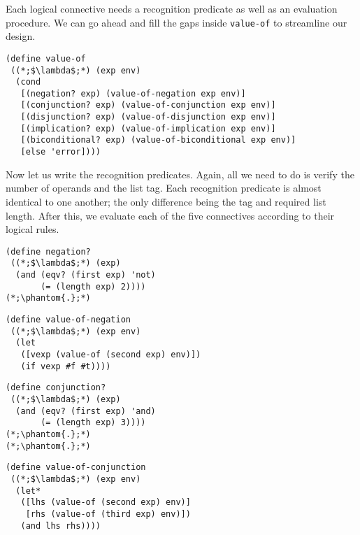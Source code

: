 Each logical connective needs a recognition predicate as well as an evaluation procedure. We can go ahead and fill the gaps inside \texttt{value-of} to streamline our design.

\begin{cl}[]{}\begin{lstlisting}[language=MyScheme]
(define value-of
 ((*;$\lambda$;*) (exp env)
  (cond
   [(negation? exp) (value-of-negation exp env)]
   [(conjunction? exp) (value-of-conjunction exp env)]
   [(disjunction? exp) (value-of-disjunction exp env)]
   [(implication? exp) (value-of-implication exp env)]
   [(biconditional? exp) (value-of-biconditional exp env)]
   [else 'error])))
\end{lstlisting}\end{cl}

Now let us write the recognition predicates. Again, all we need to do is verify the number of operands and the list tag. Each recognition predicate is almost identical to one another; the only difference being the tag and required list length. After this, we evaluate each of the five connectives according to their logical rules.

\begin{clrr}[]{}
\begin{lstlisting}[language=MyScheme]
(define negation?
 ((*;$\lambda$;*) (exp)
  (and (eqv? (first exp) 'not)
       (= (length exp) 2))))
(*;\phantom{.};*)
\end{lstlisting}
\tcblower
\begin{lstlisting}[language=MyNLNScheme]
(define value-of-negation
 ((*;$\lambda$;*) (exp env)
  (let 
   ([vexp (value-of (second exp) env)])
   (if vexp #f #t))))
\end{lstlisting}
\end{clrr}

\begin{clrr}[]{}
\begin{lstlisting}[language=MyScheme]
(define conjunction?
 ((*;$\lambda$;*) (exp)
  (and (eqv? (first exp) 'and)
       (= (length exp) 3))))
(*;\phantom{.};*)
(*;\phantom{.};*)
\end{lstlisting}
\tcblower
\begin{lstlisting}[language=MyNLNScheme]
(define value-of-conjunction
 ((*;$\lambda$;*) (exp env)
  (let* 
   ([lhs (value-of (second exp) env)]
    [rhs (value-of (third exp) env)])
   (and lhs rhs))))
\end{lstlisting}
\end{clrr}

